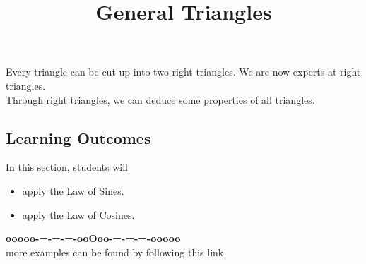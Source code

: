 \documentclass{ximera}
\title{General Triangles}
\begin{document}
\begin{abstract}
\end{abstract}
\maketitle





Every triangle can be cut up into two right triangles.  We are now experts at right triangles. \\




Through right triangles, we can deduce some properties of all triangles.











\subsection*{Learning Outcomes}


\begin{sectionOutcomes}
In this section, students will 

\begin{itemize}
\item apply the Law of Sines.
\item apply the Law of Cosines.
\end{itemize}
\end{sectionOutcomes}













\begin{center}
\textbf{\textcolor{green!50!black}{ooooo-=-=-=-ooOoo-=-=-=-ooooo}} \\

more examples can be found by following this link\\ 

\end{center}
\end{document}

